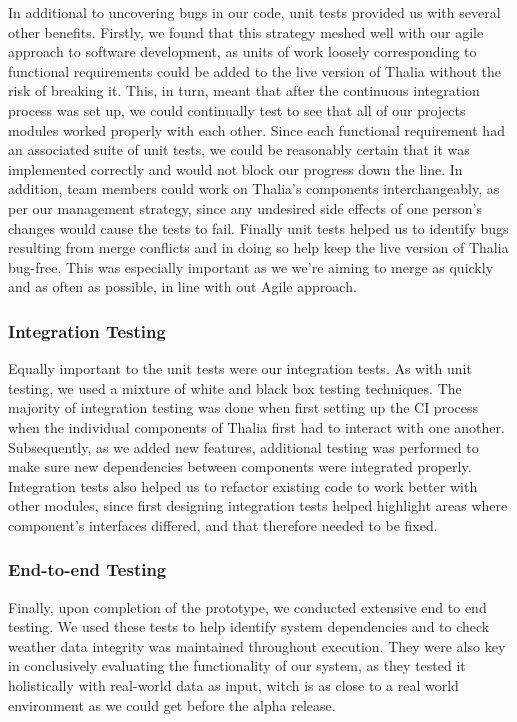 \documentclass[main.tex]{subfiles}
\begin{document}
In additional to uncovering bugs in our code, unit tests provided us with several other benefits. Firstly, we found that this strategy meshed well with our agile approach to software development, as units of work loosely corresponding to functional requirements could be added to the live version of Thalia without the risk of breaking it. This, in turn, meant that after the continuous integration process was set up, we could continually test to see that all of our projects modules worked properly with each other. Since each functional requirement had an associated suite of unit tests, we could be reasonably certain that it was implemented correctly and would not block our progress down the line. In addition, team members could work on Thalia’s components interchangeably, as per our management strategy, since any undesired side effects of one person’s changes would cause the tests to fail. Finally unit tests helped us to identify bugs resulting from merge conflicts and in doing so help keep the live version of Thalia bug-free. This was especially important as we we're aiming to merge as quickly and as often as possible, in line with out Agile approach.

\subsubsection{Integration Testing}
Equally important to the unit tests were our integration tests. As with unit testing, we used a mixture of white and black box testing techniques. The majority of integration testing was done when first setting up the CI process when the individual components of Thalia first had to interact with one another. Subsequently, as we added new features, additional testing was performed to make sure new dependencies between components were integrated properly. Integration tests also helped us to refactor existing code to work better with other modules, since first designing integration tests helped highlight areas where component's interfaces differed, and that therefore needed to be fixed.

\subsubsection{End-to-end Testing}
Finally, upon completion of the prototype, we conducted extensive end to end testing. We used these tests to help identify system dependencies and to check weather data integrity was maintained throughout execution. They were also key in conclusively evaluating the functionality of our system, as they tested it holistically with real-world data as input, witch is as close to a real world environment as we could get before the alpha release.
\end{document}
